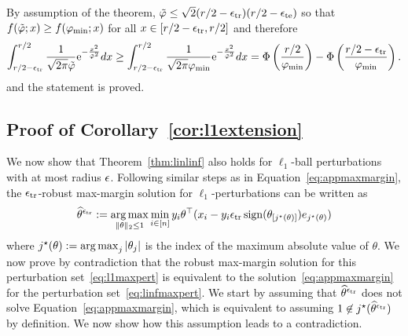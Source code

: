 By assumption of the theorem, $\tilde{\varphi} \leq \sqrt{2} (r/2-\epsilon_{\text{tr}})(r/2-\epsilon_{\text{te}})$ so that $f(\tilde{\varphi}; x) \geq f(\varphi_{\text{min}};x)$ for all $x\in [r/2-\epsilon_{\text{tr}},r/2]$ and therefore
\begin{equation*}
   \int_{r/2-\epsilon_{\text{tr}}}^{r/2} \frac{1}{\sqrt{2\pi}\tilde{\varphi}} \text{e}^{- \frac{x^2 }{\tilde{\varphi}^2}} d x \geq  \int_{r/2-\epsilon_{\text{tr}}}^{r/2} \frac{1}{\sqrt{2\pi}\varphi_{\text{min}}} \text{e}^{- \frac{x^2 }{\tilde{\varphi}^2}} d x = \Phi\left(\frac{r/2}{\varphi_{\text{min}}}\right) - \Phi\left(\frac{r/2-\epsilon_{\text{tr}}}{\varphi_{\text{min}}}\right).
\end{equation*}
and the statement is proved.





\subsection{Proof of Corollary~\ref{cor:l1extension}}
We now show that Theorem~\ref{thm:linlinf} also holds for
$\ell_1$-ball perturbations with at most radius $\epsilon$.  Following
similar steps as in Equation~\eqref{eq:appmaxmargin}, the
$\epsilon_{\text{tr}}$-robust max-margin solution for $\ell_1$-perturbations can
be written as
\begin{equation}
  \label{eq:maxmarginl1}
  \widehat{\theta}^{\epsilon_{\text{tr}}} := \operatorname*{arg\,max}_{\|\theta\|_2 \leq 1}\min_{i\in [n]}  y_i \theta^\top (x_i  - y_i  \epsilon_{\text{tr}} \operatorname*{sign}({\theta}_{[j^\star(\theta)]}) e_{j^\star(\theta)})
\end{equation}
where $j^\star(\theta) := \operatorname*{arg\,max}_j |\theta_j|$ is the index of the maximum absolute value of $\theta$.
We now prove by contradiction that the robust max-margin solution for
this perturbation set~\eqref{eq:l1maxpert} is equivalent to the solution~\eqref{eq:appmaxmargin} for the perturbation set~\eqref{eq:linfmaxpert}.
We start by assuming that $\widehat{\theta}^{\epsilon_{\text{tr}}}$ does not solve
Equation~\eqref{eq:appmaxmargin}, which is equivalent to assuming $1\not \in
j^\star(\widehat{\theta}^{\epsilon_{\text{tr}}})$ by definition. We now show how this assumption leads
to a contradiction.

